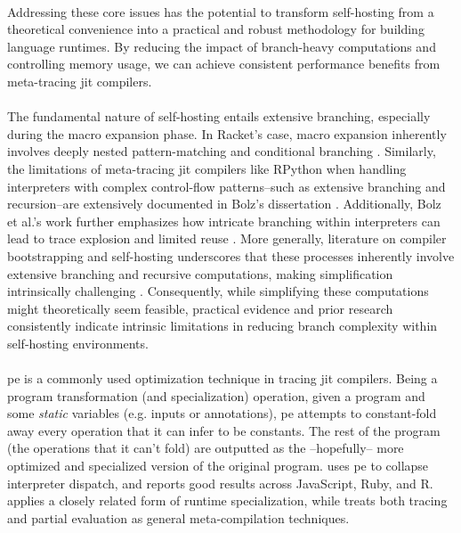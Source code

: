  \paragraph{}%
    Addressing these core issues has the potential to transform self-hosting from a theoretical convenience into a practical and robust methodology for building language runtimes. By reducing the impact of branch-heavy computations and controlling memory usage, we can achieve consistent performance benefits from meta-tracing \gls{jit} compilers.

  \paragraph{}%
    The fundamental nature of self-hosting entails extensive branching, especially during the macro expansion phase. In Racket's case, macro expansion inherently involves deeply nested pattern-matching and conditional branching \cite{icfp2019}. Similarly, the limitations of meta-tracing \gls{jit} compilers like RPython when handling interpreters with complex control-flow patterns--such as extensive branching and recursion--are extensively documented in Bolz's dissertation \cite{bolzPhDThesis}. Additionally, Bolz et al.'s work further emphasizes how intricate branching within interpreters can lead to trace explosion and limited reuse \cite{pypy-main}. More generally, literature on compiler bootstrapping and self-hosting underscores that these processes inherently involve extensive branching and recursive computations, making simplification intrinsically challenging \cite{appelCompilingContinuations2007}. Consequently, while simplifying these computations might theoretically seem feasible, practical evidence and prior research consistently indicate intrinsic limitations in reducing branch complexity within self-hosting environments.

  \paragraph{}%
    \gls{pe} is a commonly used optimization technique in tracing \gls{jit} compilers. Being a program transformation (and specialization) operation, given a program and some \emph{static} variables (e.g. inputs or annotations), \gls{pe} attempts to constant-fold away every operation that it can infer to be constants. The rest of the program (the operations that it can't fold) are outputted as the --hopefully-- more optimized and specialized version of the original program. \cite{truffle-graal} uses \gls{pe} to collapse interpreter dispatch, and \cite{practical-partial} reports good results across JavaScript, Ruby, and R.  \cite{traceMonkey} applies a closely related form of runtime specialization, while \cite{trace-vs-PE} treats both tracing and partial evaluation as general meta-compilation techniques.

